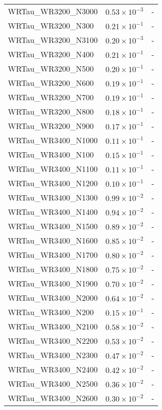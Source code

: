 \begin{longtable}[c]{| C{.35\textwidth} | C{.15\textwidth} | C{.1\textwidth}|}
    WRTau\_WR3200\_N3000 & $0.53\times10^{-3}$ & - \\
    WRTau\_WR3200\_N300 & $0.21\times10^{-1}$ & - \\
    WRTau\_WR3200\_N3100 & $0.20\times10^{-3}$ & - \\
    WRTau\_WR3200\_N400 & $0.21\times10^{-1}$ & - \\
    WRTau\_WR3200\_N500 & $0.20\times10^{-1}$ & - \\
    WRTau\_WR3200\_N600 & $0.19\times10^{-1}$ & - \\
    WRTau\_WR3200\_N700 & $0.19\times10^{-1}$ & - \\
    WRTau\_WR3200\_N800 & $0.18\times10^{-1}$ & - \\
    WRTau\_WR3200\_N900 & $0.17\times10^{-1}$ & - \\ \hline
    WRTau\_WR3400\_N1000 & $0.11\times10^{-1}$ & - \\
    WRTau\_WR3400\_N100 & $0.15\times10^{-1}$ & - \\
    WRTau\_WR3400\_N1100 & $0.11\times10^{-1}$ & - \\
    WRTau\_WR3400\_N1200 & $0.10\times10^{-1}$ & - \\
    WRTau\_WR3400\_N1300 & $0.99\times10^{-2}$ & - \\
    WRTau\_WR3400\_N1400 & $0.94\times10^{-2}$ & - \\
    WRTau\_WR3400\_N1500 & $0.89\times10^{-2}$ & - \\
    WRTau\_WR3400\_N1600 & $0.85\times10^{-2}$ & - \\
    WRTau\_WR3400\_N1700 & $0.80\times10^{-2}$ & - \\
    WRTau\_WR3400\_N1800 & $0.75\times10^{-2}$ & - \\
    WRTau\_WR3400\_N1900 & $0.70\times10^{-2}$ & - \\
    WRTau\_WR3400\_N2000 & $0.64\times10^{-2}$ & - \\
    WRTau\_WR3400\_N200 & $0.15\times10^{-1}$ & - \\
    WRTau\_WR3400\_N2100 & $0.58\times10^{-2}$ & - \\
    WRTau\_WR3400\_N2200 & $0.53\times10^{-2}$ & - \\
    WRTau\_WR3400\_N2300 & $0.47\times10^{-2}$ & - \\
    WRTau\_WR3400\_N2400 & $0.42\times10^{-2}$ & - \\
    WRTau\_WR3400\_N2500 & $0.36\times10^{-2}$ & - \\
    WRTau\_WR3400\_N2600 & $0.30\times10^{-2}$ & - \\

\end{longtable}
